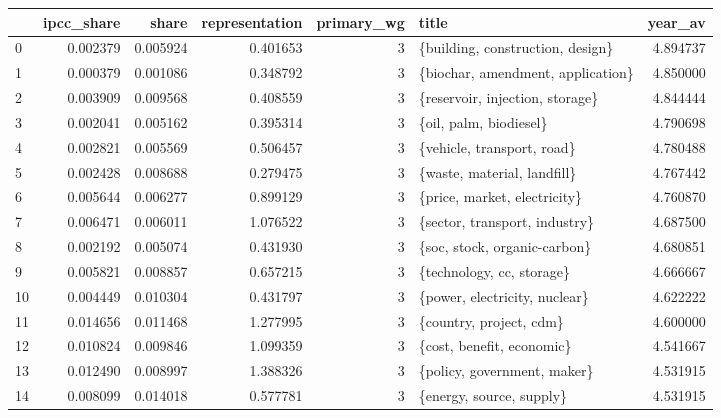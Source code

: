 \begin{tabular}{lrrrrlr}
\toprule
{} &  ipcc\_share &     share &  representation &  primary\_wg &                                   title &   year\_av \\
\midrule
0  &    0.002379 &  0.005924 &        0.401653 &           3 &        \{building, construction, design\} &  4.894737 \\
1  &    0.000379 &  0.001086 &        0.348792 &           3 &       \{biochar, amendment, application\} &  4.850000 \\
2  &    0.003909 &  0.009568 &        0.408559 &           3 &         \{reservoir, injection, storage\} &  4.844444 \\
3  &    0.002041 &  0.005162 &        0.395314 &           3 &                  \{oil, palm, biodiesel\} &  4.790698 \\
4  &    0.002821 &  0.005569 &        0.506457 &           3 &              \{vehicle, transport, road\} &  4.780488 \\
5  &    0.002428 &  0.008688 &        0.279475 &           3 &             \{waste, material, landfill\} &  4.767442 \\
6  &    0.005644 &  0.006277 &        0.899129 &           3 &            \{price, market, electricity\} &  4.760870 \\
7  &    0.006471 &  0.006011 &        1.076522 &           3 &           \{sector, transport, industry\} &  4.687500 \\
8  &    0.002192 &  0.005074 &        0.431930 &           3 &            \{soc, stock, organic-carbon\} &  4.680851 \\
9  &    0.005821 &  0.008857 &        0.657215 &           3 &               \{technology, cc, storage\} &  4.666667 \\
10 &    0.004449 &  0.010304 &        0.431797 &           3 &           \{power, electricity, nuclear\} &  4.622222 \\
11 &    0.014656 &  0.011468 &        1.277995 &           3 &                 \{country, project, cdm\} &  4.600000 \\
12 &    0.010824 &  0.009846 &        1.099359 &           3 &               \{cost, benefit, economic\} &  4.541667 \\
13 &    0.012490 &  0.008997 &        1.388326 &           3 &             \{policy, government, maker\} &  4.531915 \\
14 &    0.008099 &  0.014018 &        0.577781 &           3 &                \{energy, source, supply\} &  4.531915 \\

\end{tabular}
